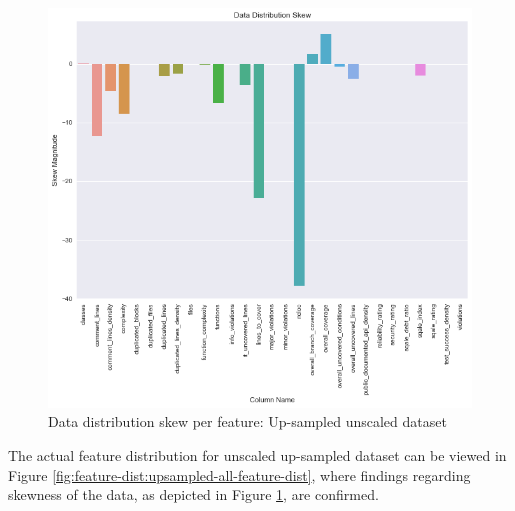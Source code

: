 \begin{figure}[!h]
    \centering
    \includegraphics[scale=0.6]{Figures/feature-dist/Data_Distribution_Skew_unmodified_upsampled.png}
    \caption{Data distribution skew per feature: Up-sampled unscaled dataset}
    \label{fig:feature-dist:skew:unmodified-upsample}
\end{figure}

The actual feature distribution for unscaled up-sampled dataset can be viewed in Figure \ref{fig:feature-dist:upsampled-all-feature-dist}, where findings regarding skewness of the data, as depicted in Figure \ref{fig:feature-dist:skew:unmodified-upsample}, are confirmed.

